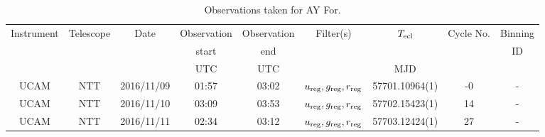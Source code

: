\begin{table}
	\begin{center}
		\caption{Observations taken for AY For.}
		\label{table:observing:observation logs AYFor}
		\begin{tabular}{ccccccccc}
			\hline
			Instrument & Telescope & Date & Observation  & Observation  & Filter(s) & $T_{\rm ecl}$ & Cycle No. & Binning \\
			 &  &  &  start &  end &  &  &  & ID \\
			 &  &  & UTC & UTC &  & MJD &  &  \\
			\hline
			\hline
			UCAM & NTT & 2016/11/09 & 01:57 & 03:02 & $u_{\rm reg},g_{\rm reg},r_{\rm reg}$ & 57701.10964(1) & -0 & - \\
			UCAM & NTT & 2016/11/10 & 03:09 & 03:53 & $u_{\rm reg},g_{\rm reg},r_{\rm reg}$ & 57702.15423(1) & 14 & - \\
			UCAM & NTT & 2016/11/11 & 02:34 & 03:12 & $u_{\rm reg},g_{\rm reg},r_{\rm reg}$ & 57703.12424(1) & 27 & - \\
		   \hline
		\end{tabular}
	\end{center}
\end{table}